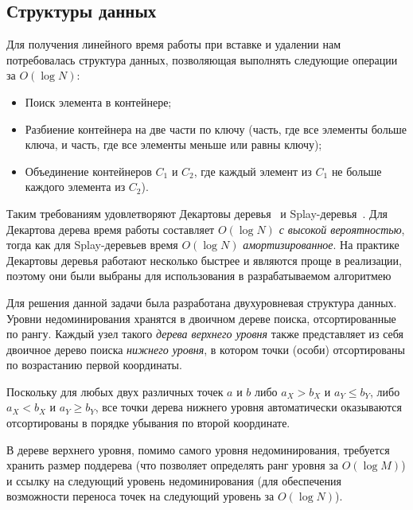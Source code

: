 \subsection{Структуры данных}
\label{algo-ds}
Для получения линейного время работы при вставке и удалении нам потребовалась структура данных,
позволяющая выполнять следующие операции за $O(\log N)$:
\begin{itemize}
	\item Поиск элемента в контейнере;
	\item Разбиение контейнера на две части по ключу (часть, где все элементы больше ключа, и часть,
	где все элементы меньше или равны ключу);
	\item Объединение контейнеров $C_1$ и $C_2$, где каждый элемент из $C_1$ не больше каждого элемента 
	из $C_2$).
\end{itemize}

Таким требованиям удовлетворяют Декартовы деревья~\cite{cartesian-tree} и Splay-деревья~\cite{splay-tree}.
Для Декартова дерева время работы составляет $O(\log N)$ \emph{с высокой вероятностью}, тогда как 
для Splay-деревьев время $O(\log N)$ \emph{амортизированное}. На практике Декартовы деревья работают несколько 
быстрее и являются проще в реализации, поэтому они
были выбраны для использования в разрабатываемом алгоритмею

Для решения данной задачи была разработана двухуровневая структура данных.
Уровни недоминирования хранятся в двоичном дереве поиска, отсортированные по рангу.
Каждый узел такого \textit{дерева верхнего уровня} также представляет из себя двоичное дерево поиска
\textit{нижнего уровня}, в котором точки (особи) отсортированы по возрастанию первой координаты.

Поскольку для любых двух различных точек $a$ и $b$ либо $a_X > b_X$ и $a_Y \le b_Y$, либо
$a_X < b_X$ и $a_Y \ge b_Y$, все точки дерева нижнего уровня автоматически оказываются отсортированы 
в порядке убывания по второй координате.

В дереве верхнего уровня, помимо самого уровня недоминирования, требуется хранить размер поддерева (что
позволяет определять ранг уровня за $O(\log M)$) и ссылку на следующий уровень недоминирования
(для обеспечения возможности переноса точек на следующий уровень за $O(\log N)$).

